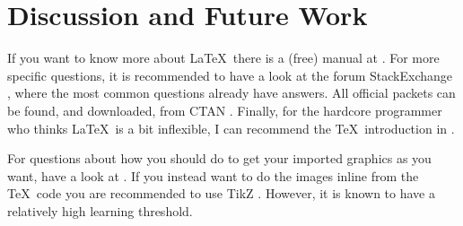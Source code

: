 \chapter{Discussion and Future Work}

If you want to know more about \LaTeX\ there is a (free) manual at \cite{cite:NotShort}. For more specific questions, it is recommended to have a look at the forum StackExchange \cite{cite:TeX.SX}, where the most common questions already have answers. All official packets can be found, and downloaded, from CTAN \cite{cite:CTAN}. Finally, for the hardcore programmer who thinks \LaTeX\ is a bit inflexible, I can recommend the \TeX\ introduction in \cite{cite:TeXimpatient}.

For questions about how you should do to get your imported graphics as you want, have a look at \cite{cite:ImportedGraphics}. If you instead want to do the images inline from the \TeX\ code you are recommended to use TikZ \cite{cite:TikZ}. However, it is known to have a relatively high learning threshold.
